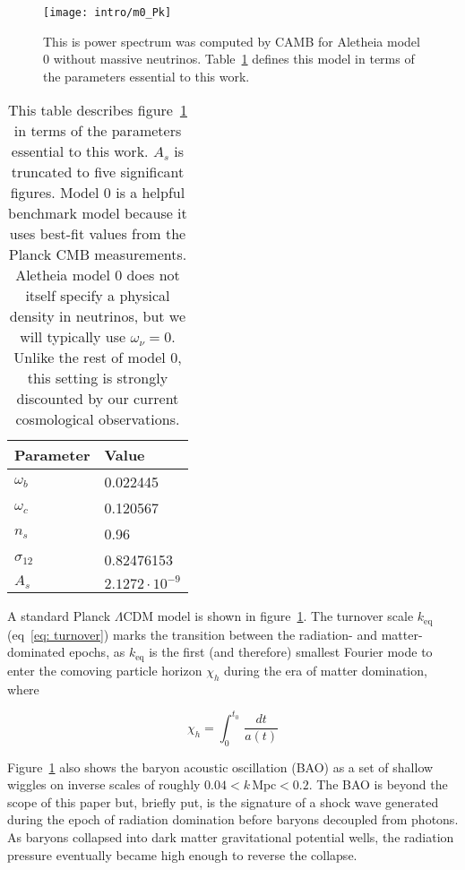 
\begin{figure}[htb]
  \centering
  \texttt{[image: intro/m0\_Pk]}
  \caption[Aletheia Model 0 Power Spectrum]{This is power spectrum was
  computed by CAMB for Aletheia model 0 without massive neutrinos.
  Table~\ref{tab: Aletheia_m0} defines this model in terms
  of the parameters essential to this work.}
  \label{fig: first_power_spectrum}
\end{figure}

\begin{table}[htb]
\centering
\begin{tabular}{l|l}
\hline
Parameter & Value \\ \hline
$\omega_b$ & 0.022445 \\
$\omega_c$ & 0.120567 \\
$n_s$ & 0.96 \\
$\sigma_{12}$ & 0.82476153 \\
$A_s$ & $2.1272 \cdot 10^{-9}$ \\ \hline
\end{tabular}
 \caption[Aletheia Model 0 Parameters]{This table describes
 figure~\ref{fig: first_power_spectrum} in terms of the parameters
 essential to this work. $A_s$ is truncated to five significant figures.
 Model 0 is a helpful benchmark model because it uses
 best-fit values from the Planck CMB measurements. Aletheia model 0 does not
 itself specify a physical density in neutrinos, but we will typically use
 $\omega_\nu = 0$. Unlike the rest of model 0, this setting is strongly 
 	discounted by our current cosmological observations.}
 \label{tab: Aletheia_m0}
\end{table}

A standard Planck $\Lambda$CDM model is shown in
figure~\ref{fig: first_power_spectrum}. The turnover scale $k_\text{eq}$
(eq~\ref{eq: turnover}) marks
the transition between the radiation- and matter-dominated epochs, as
$k_\text{eq}$ is the first (and therefore) smallest Fourier mode to enter the 
comoving particle horizon $\chi_h$ during the era of matter domination, where

\begin{equation}
\chi_h = \int_0^{t_0} \, \frac{dt}{a(t)}
\end{equation}

Figure~\ref{fig: first_power_spectrum} also shows the baryon acoustic
oscillation (BAO) as a set of shallow wiggles on inverse scales of roughly
$0.04 < k \, \text{Mpc} < 0.2$. The BAO is beyond the scope of this paper but,
briefly put, is the signature of a shock wave generated during the epoch of
radiation domination before baryons decoupled from photons. As baryons
collapsed into dark matter gravitational potential wells, the radiation
pressure eventually became high enough to reverse the collapse.

